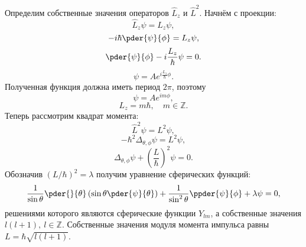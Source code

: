 \label{q:04}
Определим собственные значения операторов \( \hat{L}_z \) и
\( \hat{L}^2 \). Начнём с проекции:
\[
    \hat{L}_z\psi = L_z\psi,
\]
\[
    -i\hbar\pder{\psi}{\phi} = L_z\psi,
\]
\[
    \pder{\psi}{\phi} - i\frac{L_z}{\hbar}\psi = 0.
\]
\[
    \psi = Ae^{i\frac{L_z}{\hbar}\phi}.
\]
Полученная функция должна иметь период \( 2\pi \), поэтому
\[
    \psi = Ae^{im\phi},
\]
\[
    L_z = m\hbar,\quad m \in \mathbb{Z}.
\]
Теперь рассмотрим квадрат момента:
\[
    \hat{L}^2\psi = L^2\psi,
\]
\[
    -\hbar^2\Delta_{\theta,\phi}\psi = L^2\psi,
\]
\[
    \Delta_{\theta,\phi}\psi + (\frac{L}{\hbar})^2\psi = 0.
\]
Обозначив \( (L/\hbar)^2 = \lambda \) получим уравнение сферических функций:
\[
    \frac{1}{\sin\theta}\pder{}{\theta}
        \left(\sin\theta\pder{\psi}{\theta}\right) +
        \frac{1}{\sin^2\theta}\ppder{\psi}{\phi} + \lambda\psi = 0,
\]
решениями которого являются сферические функции \( Y_{lm} \), а собственные
значения \( l(l+1),\ l\in\mathbb Z \). Собственные значения модуля момента
импульса равны \( L = \hbar\sqrt{l(l+1)} \).

